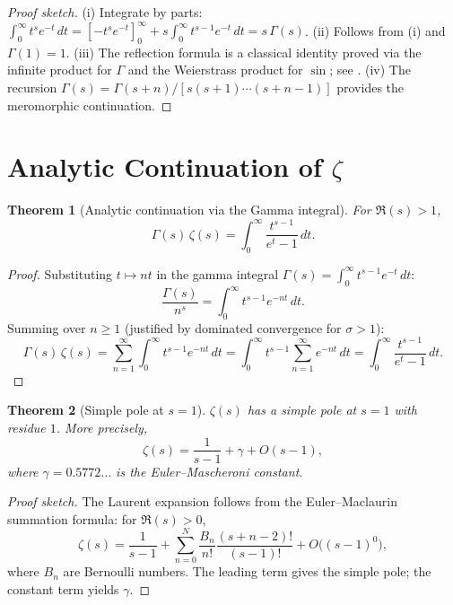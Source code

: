 \documentclass[12pt,a4paper]{amsart}
\newtheorem{theorem}{Theorem}[section]
\theoremstyle{definition}
\begin{document}
\begin{proof}[Proof sketch]
(i) Integrate by parts: $\int_0^\infty t^s e^{-t}\,dt = [-t^s e^{-t}]_0^\infty
+ s\int_0^\infty t^{s-1}e^{-t}\,dt = s\,\Gamma(s)$.
(ii) Follows from (i) and $\Gamma(1) = 1$.
(iii) The reflection formula is a classical identity proved via the infinite
product for $\Gamma$ and the Weierstrass product for $\sin$; see \cite{Ahlfors1979}.
(iv) The recursion $\Gamma(s) = \Gamma(s+n)/[s(s+1)\cdots(s+n-1)]$ provides
the meromorphic continuation.
\end{proof}

\section{Analytic Continuation of \texorpdfstring{$\zeta$}{zeta}}

\begin{theorem}[Analytic continuation via the Gamma integral]
\label{thm:continuation}
For $\Re(s) > 1$,
\[
  \Gamma(s)\,\zeta(s) = \int_0^{\infty} \frac{t^{s-1}}{e^t - 1}\,dt.
\]
\end{theorem}

\begin{proof}
Substituting $t \mapsto nt$ in the gamma integral $\Gamma(s) = \int_0^\infty t^{s-1}e^{-t}\,dt$:
\[
  \frac{\Gamma(s)}{n^s} = \int_0^{\infty} t^{s-1} e^{-nt}\,dt.
\]
Summing over $n \ge 1$ (justified by dominated convergence for $\sigma > 1$):
\[
  \Gamma(s)\,\zeta(s) = \sum_{n=1}^{\infty} \int_0^{\infty} t^{s-1} e^{-nt}\,dt
  = \int_0^{\infty} t^{s-1} \sum_{n=1}^{\infty} e^{-nt}\,dt
  = \int_0^{\infty} \frac{t^{s-1}}{e^t - 1}\,dt.
\]
\end{proof}

\begin{theorem}[Simple pole at $s=1$]
\label{thm:pole}
$\zeta(s)$ has a simple pole at $s = 1$ with residue $1$.  More precisely,
\[
  \zeta(s) = \frac{1}{s-1} + \gamma + O(s-1),
\]
where $\gamma = 0.5772\ldots$ is the Euler--Mascheroni constant.
\end{theorem}

\begin{proof}[Proof sketch]
The Laurent expansion follows from the Euler--Maclaurin summation formula:
for $\Re(s) > 0$,
\[
  \zeta(s) = \frac{1}{s-1} + \sum_{n=0}^{N} \frac{B_n}{n!}
  \frac{(s+n-2)!}{(s-1)!} + O\bigl((s-1)^0\bigr),
\]
where $B_n$ are Bernoulli numbers.  The leading term gives the simple pole;
the constant term yields $\gamma$.
\end{proof}
\end{document}
